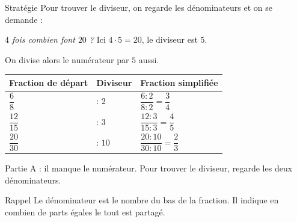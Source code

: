 \vspace{20pt}
\begin{astuce}{Stratégie}
Pour trouver le diviseur, on regarde les dénominateurs et on se demande :

\vspace{5pt}
{\centering\textit{\og $4$ fois combien font $20$ ?\fg{}} Ici $4 \cdot 5 = 20$, le diviseur est $5$.\par}

\vspace{5pt}
On divise alors le numérateur par $5$ aussi.
\end{astuce}

\vspace{20pt}
\def\arraystretch{3}
\begin{tabularx}{\linewidth}{|>{\centering\arraybackslash}X|>{\centering\arraybackslash}X|>{\centering\arraybackslash}X|}
\hline
\cellcolor{themeNO!30}\textbf{Fraction de départ} & \cellcolor{themeNO!30}\textbf{Diviseur} & \cellcolor{themeNO!30}\textbf{Fraction simplifiée} \\\hline
$\dfrac{6}{8}$ & $:\, 2$ & $\dfrac{6 : 2}{8 : 2}=\dfrac{3}{4}$ \\\hline
$\dfrac{12}{15}$ & $:\, 3$ & $\dfrac{12 : 3}{15 : 3}=\dfrac{4}{5}$ \\\hline
$\dfrac{20}{30}$ & $:\, 10$ & $\dfrac{20 : 10}{30 : 10}=\dfrac{2}{3}$ \\\hline
\end{tabularx}
\def\arraystretch{1}


\newpage


\vspace{30pt}
\textcolor{themeColor}{Partie A} : il manque le numérateur. Pour trouver le diviseur, regarde les deux dénominateurs.

\vspace{10pt}\begin{astuce}{Rappel}
Le \textcolor{themeColor}{dénominateur} est le nombre du bas de la fraction. Il indique en combien de parts égales le tout est partagé.
\end{astuce}\vspace{15pt}

